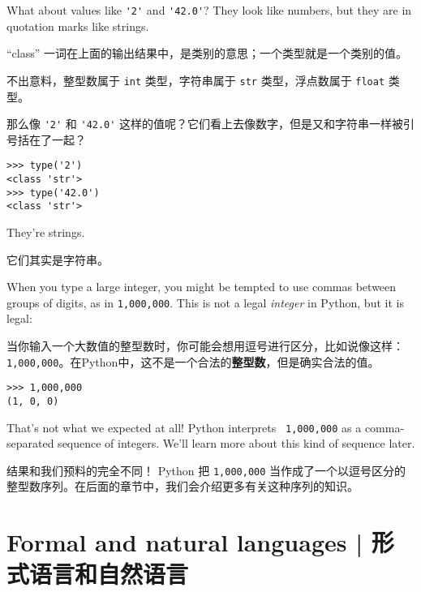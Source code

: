 What about values like \verb"'2'" and \verb"'42.0'"?
They look like numbers, but they are in quotation marks like
strings.

``class'' 一词在上面的输出结果中，是类别的意思；一个类型就是一个类别的值。

不出意料，整型数属于 \lstinline{int} 类型，字符串属于 \lstinline{str} 类型，浮点数属于 \lstinline{float} 类型。

那么像 \lstinline{'2'} 和 \lstinline{'42.0'} 这样的值呢？它们看上去像数字，但是又和字符串一样被引号括在了一起？

\begin{lstlisting}
>>> type('2')
<class 'str'>
>>> type('42.0')
<class 'str'>
\end{lstlisting}
%
They're strings.

它们其实是字符串。

When you type a large integer, you might be tempted to use commas
between groups of digits, as in {\tt 1,000,000}.  This is not a
legal {\em integer} in Python, but it is legal:

当你输入一个大数值的整型数时，你可能会想用逗号进行区分，比如说像这样：\lstinline{1,000,000}。在Python中，这不是一个合法的\textbf{整型数}，但是确实合法的值。

\begin{lstlisting}
>>> 1,000,000
(1, 0, 0)
\end{lstlisting}
%
That's not what we expected at all!  Python interprets {\tt
  1,000,000} as a comma-separated sequence of integers.  We'll learn
more about this kind of sequence later.

结果和我们预料的完全不同！ Python 把 \lstinline{1,000,000} 当作成了一个以逗号区分的整型数序列。在后面的章节中，我们会介绍更多有关这种序列的知识。




\section{Formal and natural languages  |  形式语言和自然语言}
    

